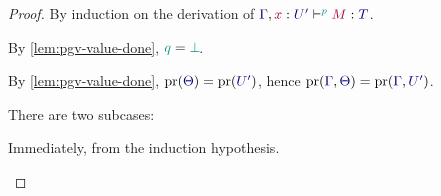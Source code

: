 \begin{proof}
  \label{prf:lem-pgv-substitution}
  By induction on the derivation of $\tseq[\cs{p}]{\ty{\Gamma},\tmty{x}{U'}}{M}{T}$.

  \begin{case*}
    By \cref{lem:pgv-value-done}, $\cs{q}=\cs{\pbot}$.
    \begin{mathpar}
    \end{mathpar}
  \end{case*}
  \begin{case*}
    By \cref{lem:pgv-value-done}, $\minpr(\ty{\Theta})=\minpr(\ty{U'})$, hence $\minpr(\ty{\Gamma},\ty{\Theta})=\minpr(\ty{\Gamma},\ty{U'})$.
    \begin{mathpar}
    \end{mathpar}
  \end{case*}
  \begin{case*}
    There are two subcases:
    \begin{subcase*}[$\tm{x}\in\tm{M}$]
      Immediately, from the induction hypothesis.
      \begin{mathpar}
\end{mathpar}
\end{subcase*}
\end{case*}
\end{proof}
